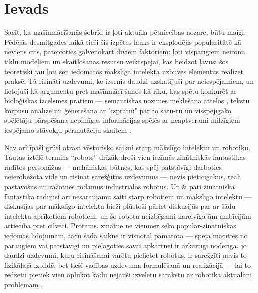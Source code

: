 \documentclass[12pt, a4paper]{article}
\numberwithin{equation}{section} %
\begin{document}

\newpage
\tableofcontents
\thispagestyle{empty}
\newpage
\setcounter{page}{3}


\section{Ievads}

Sacīt, ka mašīnmācīšanās šobrīd ir ļoti aktuāla pētniecības nozare, būtu maigi. Pēdējās desmitgades laikā tieši šis izpētes lauks ir eksplodējis popularitātē kā neviens cits, pateicoties galvenokārt diviem faktoriem: ļoti vispārīgiem neironu tīklu modeļiem un skaitļošanas resursu veiktspējai, kas beidzot ļāvusi šos teorētiski jau ļoti sen \cite{mcculloch1943logical, linnainmaa1970representation, fukushima1988neocognitron} iedomātos mākslīgā intelekta uzbūves elementus realizēt praksē. Tā risināti uzdevumi, ko izsenis daudzi uzskatījuši par neiespējamiem, un lietojuši kā argumentu pret mašīnmācī-šanos kā rīku, kas spētu konkurēt ar bioloģiskas izcelsmes prātiem --- semantiskas nozīmes meklēšana attēlos \cite{krizhevsky2012imagenet}, tekstu korpusu analīze un ģenerēšana ar "izpratni" par to satu-ru \cite{vaswani2017attention} un visspējīgāko spēlētāju pārspēšana nepilnīgas informācijas spēlēs ar neaptverami milzīgiem iespējamo stāvokļu permutāciju skaitem \cite{silver2016mastering}.

Nav arī īpaši grūti atrast vēsturisko saikni starp mākslīgo intelektu un robotiku. Tautas iztēlē termins ``robots'' drīzāk droši vien iezīmēs zinātniskās fantastikas radītos personāžus --- mehāniskas būtnes, kas spēj patstāvīgi darboties neierobežotā vidē un risināt sarežģītus uzdevumus --- nevis pieticīgākus, reāli pastāvošus un ražotnēs rodamus industriālos robotus. Un šī pati zinātniskā fantastika radījusi arī nesaraujamu saiti starp robotiem un mākslīgo intelektu \cite{asimov2004robot} --- diskusijas par mākslīgo intelektu bieži plūstoši pāriet diskusijās par ar šādu intelektu aprīkotiem robotiem, un šo robotu neizbēgami kareivīgajām ambīcijām attiecībā pret cilvēci. Protams, zinātne ne vienmēr seko populār-zinātniskās iedomas lidojumam, taču šāda saikne ir visnotaļ pamatota --- spēja mācīties no paraugiem vai patstāvīgi un pielāgoties savai apkārtnei ir ārkārtīgi noderīga, jo daudzi uzdevumi, kuru risināšanai varētu pielietot robotus, ir sarežģīti nevis to fizikālajā izpildē, bet tieši vadības uzdevuma formulēšanā un realizācijā --- lai to redzētu pietiek vien aplūkot kādu nejauši izvēlētu sarakstu ar robotikā aktuālām problēmām \cite{popsci}.
\end{document}
